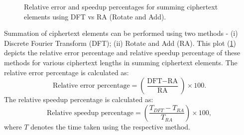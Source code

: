 \documentclass{article}
\begin{document}
\begin{figure}[h]
    \centering
    \caption{Relative error and speedup percentages for summing ciphertext elements using DFT vs RA (Rotate and Add).}
    \label{fig:relative_error_speedup}
\end{figure}

Summation of ciphertext elements can be performed using two methods - (i) Discrete Fourier Transform (DFT); (ii) Rotate and Add (RA). This plot (\ref{fig:relative_error_speedup}) depicts the relative error percentage and relative speedup percentage of these methods for various ciphertext lengths in summing ciphertext elements. The relative error percentage is calculated as:
\[
\text{Relative error percentage} = \left(\frac{\text{DFT} - \text{RA}}{\text{RA}}\right) \times 100.
\]
The relative speedup percentage is calculated as:
\[
\text{Relative speedup percentage} = \left(\frac{T_{DFT} - T_{RA}}{T_{RA}}\right) \times 100,
\]
where \( T \) denotes the time taken using the respective method.
\end{document}
